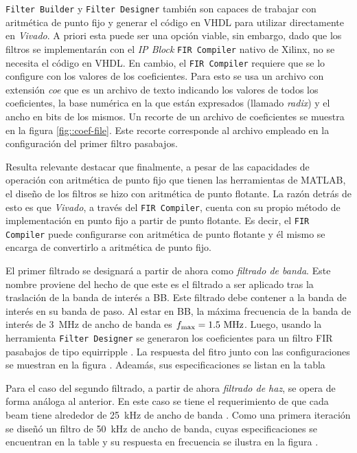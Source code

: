 \documentclass[../../main.tex]{subfiles}
\begin{document}
\texttt{Filter Builder} y \texttt{Filter Designer} también son capaces de trabajar con aritmética de punto fijo y generar el código en VHDL para utilizar directamente en \textit{Vivado}. A priori esta puede ser una opción viable, sin embargo, dado que los filtros se implementarán con el \textit{IP Block} \texttt{FIR Compiler} nativo de Xilinx, no se necesita el código en VHDL. En cambio, el \texttt{FIR Compiler} requiere que se lo configure con los valores de los coeficientes. Para esto se usa un archivo con extensión \textit{coe} que es un archivo de texto indicando los valores de todos los coeficientes, la base numérica en la que están expresados (llamado \textit{radix}) y el ancho en bits de los mismos. Un recorte de un archivo de coeficientes se muestra en la figura \ref{fig::coef-file}. Este recorte corresponde al archivo empleado en la configuración del primer filtro pasabajos.

Resulta relevante destacar que finalmente, a pesar de las capacidades de operación con aritmética de punto fijo que tienen las herramientas de MATLAB, el diseño de los filtros se hizo con aritmética de punto flotante. La razón detrás de esto es que \textit{Vivado}, a través del \texttt{FIR Compiler}, cuenta con su propio método de implementación en punto fijo a partir de punto flotante. Es decir, el \texttt{FIR Compiler} puede configurarse con aritmética de punto flotante y él mismo se encarga de convertirlo a aritmética de punto fijo.


El primer filtrado se designará a partir de ahora como \textit{filtrado de banda}. Este nombre proviene del hecho de que este es el filtrado a ser aplicado tras la traslación de la banda de interés a BB. Este filtrado debe contener a la banda de interés en su banda de paso. Al estar en BB, la máxima frecuencia de la banda de interés de 3~MHz de ancho de banda es $f_\textrm{max} = 1.5~\textrm{MHz}$. Luego, usando la herramienta \texttt{Filter Designer} se generaron los coeficientes para un filtro FIR pasabajos de tipo equirripple . La respuesta del fitro junto con las configuraciones se muestran en la figura . Adeamás, sus especificaciones se listan en la tabla 

Para el caso del segundo filtrado, a partir de ahora \textit{filtrado de haz}, se opera de forma análoga al anterior. En este caso se tiene el requerimiento de que cada beam tiene alrededor de 25~kHz de ancho de banda . Como una primera iteración se diseñó un filtro de 50~kHz de ancho de banda, cuyas especificaciones se encuentran en la table  y su respuesta en frecuencia se ilustra en la figura .
\end{document}
